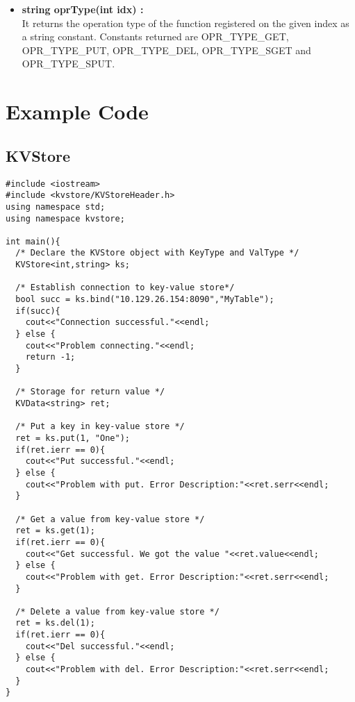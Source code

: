 \documentclass[11pt]{article}
\begin{document}
\begin{itemize}
\begin{itemize}
\item \textbf{string oprType(int idx) :}\\
It returns the operation type of the function registered on the given index as a string constant. Constants returned are OPR\_TYPE\_GET, OPR\_TYPE\_PUT, OPR\_TYPE\_DEL, OPR\_TYPE\_SGET and OPR\_TYPE\_SPUT.
\end{itemize}
\end{itemize}

\section{Example Code}
\subsection{KVStore}
\begin{lstlisting}
#include <iostream>
#include <kvstore/KVStoreHeader.h>
using namespace std;
using namespace kvstore;

int main(){
  /* Declare the KVStore object with KeyType and ValType */
  KVStore<int,string> ks;
  
  /* Establish connection to key-value store*/
  bool succ = ks.bind("10.129.26.154:8090","MyTable");
  if(succ){
    cout<<"Connection successful."<<endl;
  } else {
    cout<<"Problem connecting."<<endl;
    return -1;
  }
  
  /* Storage for return value */
  KVData<string> ret;
  
  /* Put a key in key-value store */
  ret = ks.put(1, "One");
  if(ret.ierr == 0){
    cout<<"Put successful."<<endl;
  } else {
    cout<<"Problem with put. Error Description:"<<ret.serr<<endl;
  }
  
  /* Get a value from key-value store */
  ret = ks.get(1);
  if(ret.ierr == 0){
    cout<<"Get successful. We got the value "<<ret.value<<endl;
  } else {
    cout<<"Problem with get. Error Description:"<<ret.serr<<endl;
  }
  
  /* Delete a value from key-value store */
  ret = ks.del(1);
  if(ret.ierr == 0){
    cout<<"Del successful."<<endl;
  } else {
    cout<<"Problem with del. Error Description:"<<ret.serr<<endl;
  }
}
\end{lstlisting}
\end{document}
